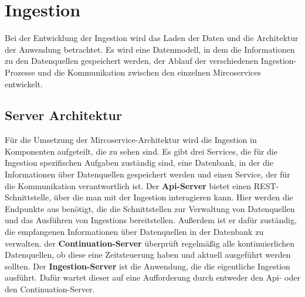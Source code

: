 \section{Ingestion}
Bei der Entwicklung der Ingestion wird das Laden der Daten und die Architektur der Anwendung betrachtet.
Es wird eine Datenmodell, in dem die Informationen zu den Datenquellen gespeichert werden, der Ablauf der verschiedenen Ingestion-Prozesse und die Kommunikation zwischen den einzelnen Mircoservices entwickelt.

\subsection{Server Architektur}

Für die Umsetzung der Mircoservice-Architektur wird die Ingestion in Komponenten aufgeteilt, die  zu sehen sind.
Es gibt drei Services, die für die Ingestion spezifischen Aufgaben zuständig sind, eine Datenbank, in der die Informationen über Datenquellen gespeichert werden und einen Service, der für die Kommunikation verantwortlich ist.
Der \textbf{Api-Server} bietet einen REST-Schnittstelle, über die man mit der Ingestion interagieren kann.
Hier werden die Endpunkte aus  benötigt, die die Schnittstellen zur Verwaltung von Datenquellen und das Ausführen von Ingestions bereitstellen.
Außerdem ist er dafür zuständig, die empfangenen Informationen über Datenquellen in der Datenbank zu verwalten.
der \textbf{Continuation-Server} überprüft regelmäßig alle kontinuierlichen Datenquellen, ob diese eine Zeitsteuerung haben und aktuell ausgeführt werden sollten.
Der \textbf{Ingestion-Server} ist die Anwendung, die die eigentliche Ingestion ausführt.
Dafür wartet dieser auf eine Aufforderung durch entweder den Api- oder den Continuation-Server.

